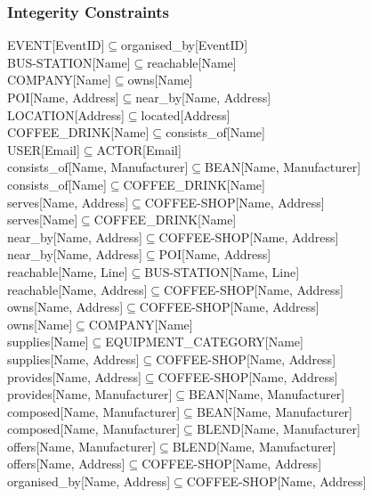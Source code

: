 \subsubsection{Integerity Constraints}
EVENT[EventID]$\subseteq$organised\_by[EventID]\\
BUS-STATION[Name]$\subseteq$reachable[Name]\\
COMPANY[Name]$\subseteq$owns[Name]\\
POI[Name, Address]$\subseteq$near\_by[Name, Address]\\
LOCATION[Address]$\subseteq$located[Address]\\
COFFEE\_DRINK[Name]$\subseteq$consists\_of[Name]\\
USER[Email]$\subseteq$ACTOR[Email]\\
consists\_of[Name, Manufacturer]$\subseteq$BEAN[Name, Manufacturer]\\
consists\_of[Name]$\subseteq$COFFEE\_DRINK[Name]\\
serves[Name, Address]$\subseteq$COFFEE-SHOP[Name, Address]\\
serves[Name]$\subseteq$COFFEE\_DRINK[Name]\\
near\_by[Name, Address]$\subseteq$COFFEE-SHOP[Name, Address]\\
near\_by[Name, Address]$\subseteq$POI[Name, Address]\\
reachable[Name, Line]$\subseteq$BUS-STATION[Name, Line]\\
reachable[Name, Address]$\subseteq$COFFEE-SHOP[Name, Address]\\
owns[Name, Address]$\subseteq$COFFEE-SHOP[Name, Address]\\
owns[Name]$\subseteq$COMPANY[Name]\\
supplies[Name]$\subseteq$EQUIPMENT\_CATEGORY[Name]\\
supplies[Name, Address]$\subseteq$COFFEE-SHOP[Name, Address]\\
provides[Name, Address]$\subseteq$COFFEE-SHOP[Name, Address]\\
provides[Name, Manufacturer]$\subseteq$BEAN[Name, Manufacturer]\\
composed[Name, Manufacturer]$\subseteq$BEAN[Name, Manufacturer]\\
composed[Name, Manufacturer]$\subseteq$BLEND[Name, Manufacturer]\\
offers[Name, Manufacturer]$\subseteq$BLEND[Name, Manufacturer]\\
offers[Name, Address]$\subseteq$COFFEE-SHOP[Name, Address]\\
organised\_by[Name, Address]$\subseteq$COFFEE-SHOP[Name, Address]\\
